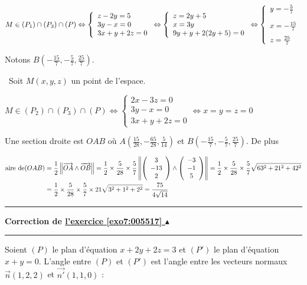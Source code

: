 \documentclass[11pt,a4paper]{article}
\newcounter{exo}
\newcommand{\correction}[1]{\hypertarget{cor7:#1}{}\label{cor7:#1}{\bf Correction de \hyperlink{exo7:#1}{l'exercice \ref{exo7:#1} $\blacktriangle$}}\vspace{1mm}\hrule\vspace{1mm}}
\newcommand{\fincorrection}{\vspace{1mm}\hrule\vspace*{7mm}}
\begin{document}
\begin{center}
$M\in(P_1)\cap(P_3)\cap(P)\Leftrightarrow
\left\{
\begin{array}{l}
z-2y=5\\
3y-x=0\\
3x+y+2z=0
\end{array}
\right.\Leftrightarrow\left\{
\begin{array}{l}
z=2y+5\\
x=3y\\
9y+y+2(2y+5)=0
\end{array}
\right.\Leftrightarrow\left\{
\begin{array}{l}
y=-\frac{5}{7}\\
x=-\frac{15}{7}\rule[-4mm]{0mm}{11mm}\\
z=\frac{25}{7}
\end{array}
\right.$
\end{center}
Notons $B\left(-\frac{15}{7},-\frac{5}{7},\frac{25}{7}\right)$.

\textbullet~Soit $M(x,y,z)$ un point de l'espace.

\begin{center}
$M\in(P_2)\cap(P_3)\cap(P)\Leftrightarrow
\left\{
\begin{array}{l}
2x-3z=0\\
3y-x=0\\
3x+y+2z=0
\end{array}
\right.\Leftrightarrow x=y=z=0$
\end{center}
Une section droite est $OAB$ où $A\left(\frac{15}{28},-\frac{65}{28},\frac{5}{14}\right)$ et $B\left(-\frac{15}{7},-\frac{5}{7},\frac{25}{7}\right)$. De plus

\begin{align*}\ensuremath
\text{aire de}(OAB)&=\frac{1}{2}\left\|\overrightarrow{OA}\wedge\overrightarrow{OB}\right\|=\frac{1}{2}\times\frac{5}{28}\times\frac{5}{7}\left\|\left(
\begin{array}{c}
3\\
-13\\
2
\end{array}\right)
\wedge
\left(
\begin{array}{c}
-3\\
-1\\
5
\end{array}\right)\right\|=\frac{1}{2}\times\frac{5}{28}\times\frac{5}{7}\sqrt{63^2+21^2+42^2}\\
 &=\frac{1}{2}\times\frac{5}{28}\times\frac{5}{7}\times21\sqrt{3^2+1^2+2^2}=\frac{75}{4\sqrt{14}}
\end{align*}
\begin{center}
\end{center}
\fincorrection
\correction{005517}
Soient $(P)$ le plan d'équation $x+2y+2z=3$ et $(P')$ le plan d'équation $x+y=0$. L'angle entre $(P)$ et $(P')$ est l'angle entre les vecteurs normaux $\overrightarrow{n}(1,2,2)$ et $\overrightarrow{n'}(1,1,0)$ :
\end{document}
